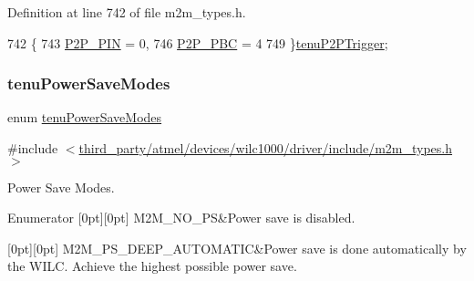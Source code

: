 Definition at line 742 of file m2m\+\_\+types.\+h.


\begin{DoxyCode}
742             \{
743     \hyperlink{group__WlanEnums_gga0b97cca65d26d6163cabcb708e5759dfad460eb448f86bb487da38d2a4adc6056}{P2P\_PIN} = 0,
746     \hyperlink{group__WlanEnums_gga0b97cca65d26d6163cabcb708e5759dfacf766568f64b21ce7adc08da42cf6ffd}{P2P\_PBC} = 4
749 \}\hyperlink{group__WlanEnums_ga0b97cca65d26d6163cabcb708e5759df}{tenuP2PTrigger};
\end{DoxyCode}
\mbox{\label{group__WlanEnums_gae6bd0ac78bfca4cda17d9dbedf79ad7e}} 
\subsubsection{\texorpdfstring{tenu\+Power\+Save\+Modes}{tenuPowerSaveModes}}
{\footnotesize\ttfamily enum \hyperlink{group__WlanEnums_gae6bd0ac78bfca4cda17d9dbedf79ad7e}{tenu\+Power\+Save\+Modes}}



{\ttfamily \#include $<$\hyperlink{m2m__types_8h}{third\+\_\+party/atmel/devices/wilc1000/driver/include/m2m\+\_\+types.\+h}$>$}



Power Save Modes. 

\begin{DoxyEnumFields}{Enumerator}
[0pt][0pt]{}\mbox{\label{group__WlanEnums_ggae6bd0ac78bfca4cda17d9dbedf79ad7ea3981eb69690432d09abdf1c5dd75d435}} 
M2\+M\+\_\+\+N\+O\+\_\+\+PS&Power save is disabled. \\
\hline

[0pt][0pt]{}\mbox{\label{group__WlanEnums_ggae6bd0ac78bfca4cda17d9dbedf79ad7ea6e07d1e218848620c1473a92f7a5ec10}} 
M2\+M\+\_\+\+P\+S\+\_\+\+D\+E\+E\+P\+\_\+\+A\+U\+T\+O\+M\+A\+T\+IC&Power save is done automatically by the W\+I\+LC. Achieve the highest possible power save. \\
\hline

\end{DoxyEnumFields}


